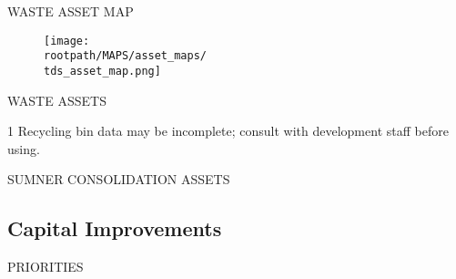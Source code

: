 \pagebreak

\textcolor{ccorange}{WASTE ASSET MAP}
\begin{figure}[H]
\raggedright
\texttt{[image: \\rootpath/MAPS/asset\_maps/\\tds\_asset\_map.png]}
\end{figure}
\pagebreak

\textcolor{ccorange}{WASTE ASSETS}

\begin{table}[H]
\begin{threeparttable}
\small



\begin{tablenotes}
\item [1] Recycling bin data may be incomplete; consult with development staff before using.
\end{tablenotes}
\end{threeparttable}
\end{table}

\textcolor{ccorange}{SUMNER CONSOLIDATION ASSETS}
\begin{table}[H]

\end{table}
\pagebreak
\textcolor{ccorange}{\section{Capital Improvements}}

\begin{table}[H]



\end{table}
\pagebreak

\textcolor{ccorange}{PRIORITIES}

\pagebreak
\pagestyle{plain}
\pagecolor{ccfuschia}
\pagebreak
{}
\pagestyle{fancy}
\fancyhf{}
\renewcommand{\chaptermark}[1]{\markboth{#1}{}}
\fancyfoot[LE,RO]{\thepage}


